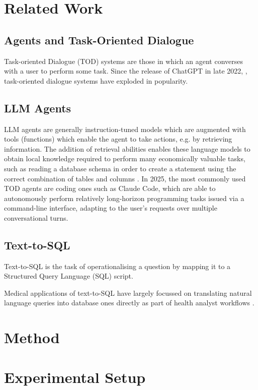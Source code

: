 \documentclass[11pt]{article}
\begin{document}
\section{Related Work}

\subsection{Agents and Task-Oriented Dialogue}
Task-oriented Dialogue (TOD) systems are those in which an agent converses with a user to perform some task.
Since the release of ChatGPT in late 2022, \cite{}, task-oriented dialogue systems have exploded in popularity.


\subsection{LLM Agents}
LLM agents are generally instruction-tuned models which are augmented with tools (functions) which enable the agent to take actions, e.g. by retrieving information.
The addition of retrieval abilities enables these language models to obtain local knowledge required to perform many economically valuable tasks, such as reading a database schema in order to create a statement using the correct combination of tables and columns \cite{ReAct}.
In 2025, the most commonly used TOD agents are coding ones such as Claude Code, which are able to autonomously perform relatively long-horizon programming tasks issued via a command-line interface, adapting to the user's requests over multiple conversational turns\cite{METR}.


\subsection{Text-to-SQL}
Text-to-SQL is the task of operationalising a question by mapping it to a Structured Query Language (SQL) script.

Medical applications of text-to-SQL have largely focussed on translating natural language queries into database ones directly as part of health analyst workflows \citet{ziletti 2024}.

\section{Method}

\section{Experimental Setup}
\end{document}
